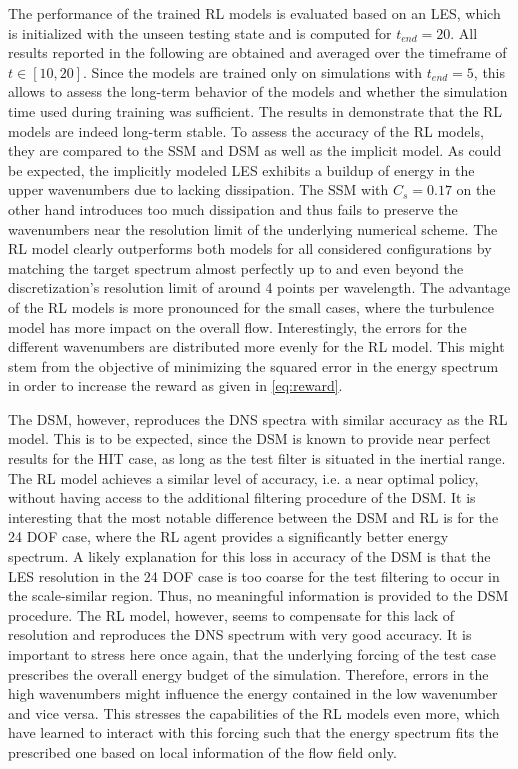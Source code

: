 The performance of the trained RL models is evaluated based on an LES, which is initialized with the unseen testing state and is computed for $t_{end}=20$.
All results reported in the following are obtained and averaged over the timeframe of $t\in[10,20]$.
Since the models are trained only on simulations with $t_{end}=5$, this allows to assess the long-term behavior of the models and whether the simulation time used during training was sufficient.
The results in  demonstrate that the RL models are indeed long-term stable.
To assess the accuracy of the RL models, they are compared to the SSM and DSM as well as the implicit model.
As could be expected, the implicitly modeled LES exhibits a buildup of energy in the upper wavenumbers due to lacking dissipation.
The SSM with $C_s=0.17$ on the other hand introduces too much dissipation and thus fails to preserve the wavenumbers near the resolution limit of the underlying numerical scheme.
The RL model clearly outperforms both models for all considered configurations by matching the target spectrum almost perfectly up to and even beyond the discretization's resolution limit of around 4 points per wavelength.
The advantage of the RL models is more pronounced for the small cases, where the turbulence model has more impact on the overall flow.
Interestingly, the errors for the different wavenumbers are distributed more evenly for the RL model.
This might stem from the objective of minimizing the squared error in the energy spectrum in order to increase the reward as given in \eqref{eq:reward}. 

The DSM, however, reproduces the DNS spectra with similar accuracy as the RL model.
This is to be expected, since the DSM is known to provide near perfect results for the HIT case, as long as the test filter is situated in the inertial range.
The RL model achieves a similar level of accuracy, i.e. a near optimal policy, without having access to the additional filtering procedure of the DSM.
It is interesting that the most notable difference between the DSM and RL is for the 24 DOF case, where the RL agent provides a signiﬁcantly better energy spectrum.
A likely explanation for this loss in accuracy of the DSM is that the LES resolution in the 24 DOF case is too coarse for the test filtering to occur in the scale-similar region.
Thus, no meaningful information is provided to the DSM procedure.
The RL model, however, seems to compensate for this lack of resolution and reproduces the DNS spectrum with very good accuracy.
It is important to stress here once again, that the underlying forcing of the test case prescribes the overall energy budget of the simulation.
Therefore, errors in the high wavenumbers might influence the energy contained in the low wavenumber and vice versa.
This stresses the capabilities of the RL models even more, which have learned to interact with this forcing such that the energy spectrum fits the prescribed one based on local information of the flow field only.

